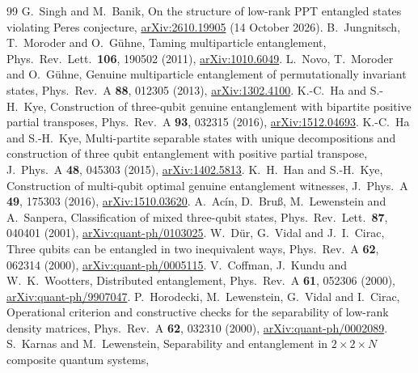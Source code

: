 \documentclass[11pt]{article}
\theoremstyle{remark}
\begin{document}
\appendix
\small








\begin{thebibliography}{99}
\small\setlength{\itemsep}{0pt}
 G.~Singh and M.~Banik, On the structure of low-rank PPT entangled states violating Peres conjecture,
\href{https://arxiv.org/abs/2610.19905}{arXiv:2610.19905} (14 October 2026).
 B.~Jungnitsch, T.~Moroder and O.~G\"uhne, Taming multiparticle entanglement, Phys.\ Rev.\ Lett.\
\textbf{106}, 190502 (2011), \href{https://arxiv.org/abs/1010.6049}{arXiv:1010.6049}.
\bibitem{NMG} L.~Novo, T.~Moroder and O.~G\"uhne, Genuine multiparticle entanglement of permutationally invariant states,
Phys.\ Rev.\ A \textbf{88}, 012305 (2013), \href{https://arxiv.org/abs/1302.4100}{arXiv:1302.4100}.
\bibitem{HK} K.-C.~Ha and S.-H.~Kye, Construction of three-qubit genuine entanglement with bipartite positive partial
transposes, Phys.\ Rev.\ A \textbf{93}, 032315 (2016), \href{https://arxiv.org/abs/1512.04693}{arXiv:1512.04693}.
\bibitem{HaKye15} K.-C.~Ha and S.-H.~Kye, Multi-partite separable states with unique decompositions and construction of
three qubit entanglement with positive partial transpose, J.\ Phys.\ A \textbf{48}, 045303 (2015),
\href{https://arxiv.org/abs/1402.5813}{arXiv:1402.5813}.
 K.~H.~Han and S.-H.~Kye, Construction of multi-qubit optimal genuine entanglement witnesses, J.\ Phys.\ A
\textbf{49}, 175303 (2016), \href{https://arxiv.org/abs/1510.03620}{arXiv:1510.03620}.
\bibitem{ABLS} A.~Ac\'in, D.~Bru\ss, M.~Lewenstein and A.~Sanpera, Classification of mixed three-qubit states, Phys.\ Rev.\
Lett.\ \textbf{87}, 040401 (2001), \href{https://arxiv.org/abs/quant-ph/0103025}{arXiv:quant-ph/0103025}.
\bibitem{DVC} W.~D\"ur, G.~Vidal and J.~I.~Cirac, Three qubits can be entangled in two inequivalent ways, Phys.\ Rev.\ A
\textbf{62}, 062314 (2000), \href{https://arxiv.org/abs/quant-ph/0005115}{arXiv:quant-ph/0005115}.
\bibitem{CKW} V.~Coffman, J.~Kundu and W.~K.~Wootters, Distributed entanglement, Phys.\ Rev.\ A \textbf{61}, 052306 (2000),
\href{https://arxiv.org/abs/quant-ph/9907047}{arXiv:quant-ph/9907047}.
\bibitem{HLVC} P.~Horodecki, M.~Lewenstein, G.~Vidal and I.~Cirac, Operational criterion and constructive checks for the separability of low-rank density matrices, Phys.\ Rev.\ A \textbf{62}, 032310 (2000), \href{https://arxiv.org/abs/quant-ph/0002089}{arXiv:quant-ph/0002089}.
\bibitem{KL} S.~Karnas and M.~Lewenstein, Separability and entanglement in $2\times2\times N$ composite quantum systems,

\end{thebibliography}
\end{document}
